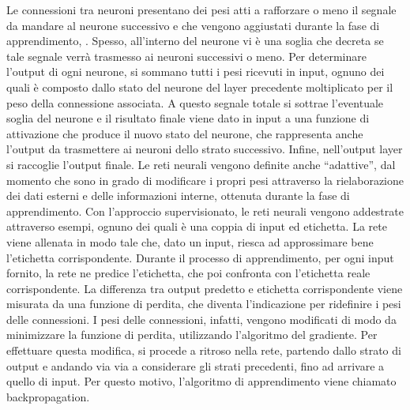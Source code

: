 \documentclass[11pt,  oneside, openany]{book}
\begin{document}
Le connessioni tra neuroni presentano dei pesi atti a rafforzare o meno il segnale da mandare al neurone successivo e che vengono aggiustati durante la fase di apprendimento, . Spesso, all'interno del neurone vi è una soglia che decreta se tale segnale verrà trasmesso ai neuroni successivi o meno. Per determinare l'output di ogni neurone, si sommano tutti i pesi ricevuti in input, ognuno dei quali è composto dallo stato del neurone del layer precedente moltiplicato per il peso della connessione associata. 
A questo segnale totale si sottrae l'eventuale soglia del neurone e il risultato finale viene dato in input a una funzione di attivazione che produce il nuovo stato del neurone, che rappresenta anche l'output da trasmettere ai neuroni dello strato successivo. Infine, nell'output layer si raccoglie l'output finale. 
Le reti neurali vengono definite anche ``adattive'', dal momento che sono in grado di modificare i propri pesi attraverso la rielaborazione dei dati esterni e delle informazioni interne, ottenuta durante la fase di apprendimento. Con l'approccio supervisionato, le reti neurali vengono addestrate attraverso esempi, ognuno dei quali è una coppia di input ed etichetta. La rete viene allenata in modo tale che, dato un input, riesca ad approssimare bene l'etichetta corrispondente. Durante il processo di apprendimento, per ogni input fornito, la rete ne predice l'etichetta, che poi confronta con l'etichetta reale corrispondente. La differenza tra output predetto e etichetta corrispondente viene misurata da una funzione di perdita, che diventa l'indicazione per ridefinire i pesi delle connessioni. I pesi delle connessioni, infatti, vengono modificati di modo da minimizzare la funzione di perdita, utilizzando l'algoritmo del gradiente. Per effettuare questa modifica, si procede a ritroso nella rete, partendo dallo strato di output e andando via via a considerare gli strati precedenti, fino ad arrivare a quello di input. Per questo motivo, l'algoritmo di apprendimento viene chiamato backpropagation. 
\end{document}
